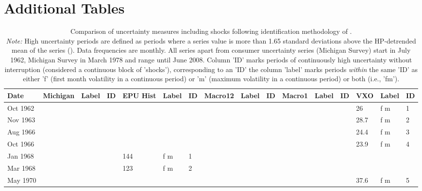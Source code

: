 \documentclass[a4paper,11pt,listof=nochaptergap,oneside,pointednumbers,bibtotoc,bigheadings,liststotoc]{scrbook}
\begin{document}
\section{Additional Tables}
\label{sec:additionalTables}
\begin{spacing}{.3}
\begin{landscape}
    \centering
    \begin{scriptsize}
    \begin{longtable}{|l|lll|lll|lll|lll|lll|}
    \caption[Comparison of uncertainty measures including shocks following identification methodology of \citet{bloom:09}.]{Comparison of uncertainty measures including shocks following identification methodology of \citet{bloom:09}. \\
    \textit{Note:} High uncertainty periods are defined as periods where a series value is more than 1.65 standard deviations above the HP-detrended mean of the series (\citealp{bloom:09}). Data frequencies are monthly. All series apart from consumer uncertainty series (Michigan Survey) start in July 1962, Michigan Survey in March 1978 and range until June 2008. Column 'ID' marks periods of continuously high uncertainty without interruption (considered a continuous block of 'shocks'), corresponding to an 'ID' the column 'label' marks periods \textit{within} the same 'ID' as either 'f' (first month volatility in a continuous period) or 'm' (maximum volatility in a continuous period) or both (i.e., 'fm').}\\    %
\toprule
    \textbf{Date} & \textbf{Michigan} & \textbf{Label} & \textbf{ID} & \textbf{EPU Hist} & \textbf{Label} & \textbf{ID} & \textbf{Macro12} & \textbf{Label} & \textbf{ID} & \textbf{Macro1} & \textbf{Label} & \textbf{ID} & \textbf{VXO} & \textbf{Label} & \textbf{ID} \\ 
    \midrule
    \endhead
       Oct 1962 &  &  &  &  &  &  &  &  &  &  &  &  & 26 & f m & 1 \\
        Nov 1963 &  &  &  &  &  &  &  &  &  &  &  &  & 28.7 & f m & 2 \\
        Aug 1966 &  &  &  &  &  &  &  &  &  &  &  &  & 24.4 & f m & 3 \\
        Oct 1966 &  &  &  &  &  &  &  &  &  &  &  &  & 23.9 & f m & 4 \\
        Jan 1968 &  &  &  & 144 & f m & 1 &  &  &  &  &  &  &  &  &  \\
        Mar 1968 &  &  &  & 123 & f m & 2 &  &  &  &  &  &  &  &  &  \\
        May 1970 &  &  &  &  &  &  &  &  &  &  &  &  & 37.6 & f m & 5 \\

\end{longtable}
\end{scriptsize}
\end{landscape}
\end{spacing}
\end{document}
